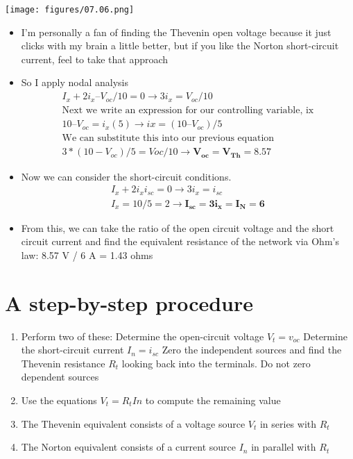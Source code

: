 \documentclass[11pt]{book}
\begin{document}
\texttt{[image: figures/07.06.png]}

\begin{itemize}
	\item I’m personally a fan of finding the Thevenin open voltage because it just clicks with my brain a little better, but if you like the Norton short-circuit current, feel to take that approach
	\item So I apply nodal analysis
	\begin{eqnarray}
		I_x + 2i_x – V_{oc}/10 = 0 \rightarrow 3i_x = V_{oc}/10 \\
		\text{Next we write an expression for our controlling variable, ix} \\
		10 – V_{oc} = i_x(5) \rightarrow ix = (10 – V_{oc})/5 \\
		\text{We can substitute this into our previous equation} \\
		3*(10-V_{oc})/5 = Voc/10 \rightarrow \mathbf{V_{oc} = V_{Th} = 8.57 }
	\end{eqnarray}
	\item Now we can consider the short-circuit conditions.
	\begin{eqnarray}
		I_x + 2i_x i_{sc} = 0 \rightarrow 3i_x = i_{sc} \\
		I_x = 10/5 = 2 \rightarrow \mathbf{I_{sc} = 3i_x = I_N = 6} 
	\end{eqnarray}
	\item From this, we can take the ratio of the open circuit voltage and the short circuit current and find the equivalent resistance of the network via Ohm's law: 8.57 V / 6 A = 1.43 ohms
\end{itemize}

\section{A step-by-step procedure}
\begin{enumerate}
	\item Perform two of these:
	\subitem Determine the open-circuit voltage $V_t = v_{oc}$
	\subitem Determine the short-circuit current $I_n = i_{sc}$
	\subitem Zero the independent sources and find the Thevenin resistance $R_t$ looking back into the terminals. Do not zero dependent sources
	\item Use the equations $V_t = R_tIn$ to compute the remaining value
	\item The Thevenin equivalent consists of a voltage source $V_t$ in series with $R_t$
	\item The Norton equivalent consists of a current source $I_n$ in parallel with $R_t$
\end{enumerate}
\end{document}
